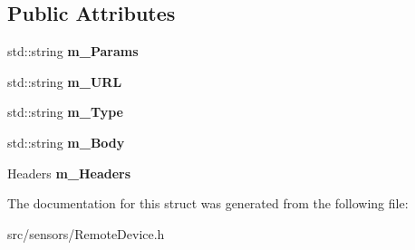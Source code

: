 \subsection*{Public Attributes}
\begin{DoxyCompactItemize}
\item 
\mbox{\label{struct_remote_device_1_1_rest_a9dcdb35021c66f231c89619c08d7e8c3}} 
std\+::string {\bfseries m\+\_\+\+Params}
\item 
\mbox{\label{struct_remote_device_1_1_rest_aca9c5b225d26da29639ff67f814f75c4}} 
std\+::string {\bfseries m\+\_\+\+U\+RL}
\item 
\mbox{\label{struct_remote_device_1_1_rest_a1d3bb10f853b75996b892c44e7c96965}} 
std\+::string {\bfseries m\+\_\+\+Type}
\item 
\mbox{\label{struct_remote_device_1_1_rest_ad8f90c79ff2d8ec1829e086eea2da9ad}} 
std\+::string {\bfseries m\+\_\+\+Body}
\item 
\mbox{\label{struct_remote_device_1_1_rest_ad72cedf2f99d1bf18da712ac0b7751c6}} 
Headers {\bfseries m\+\_\+\+Headers}
\end{DoxyCompactItemize}


The documentation for this struct was generated from the following file\+:\begin{DoxyCompactItemize}
\item 
src/sensors/Remote\+Device.\+h\end{DoxyCompactItemize}
